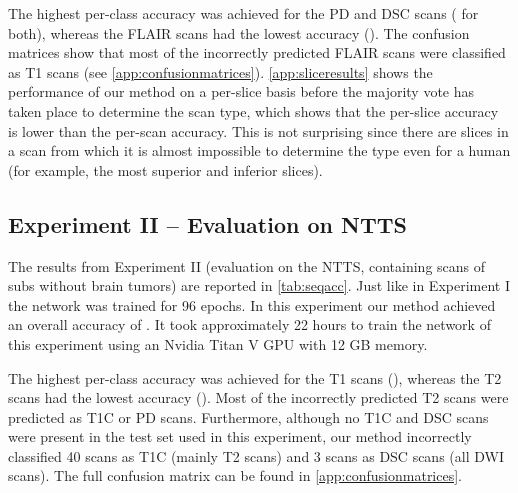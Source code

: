 The highest per-class accuracy was achieved for the \gls{PD} and \gls{DSC} \glspl{scan} ( for both), whereas the \gls{FLAIR} \glspl{scan} had the lowest accuracy ().
The confusion matrices show that most of the incorrectly predicted \gls{FLAIR} \glspl{scan} were classified as \gls{T1} \glspl{scan} (see  \cref{app:confusionmatrices}).
\cref{app:sliceresults} shows the performance of our method on a per-\gls{slice} basis before the majority vote has taken place to determine the \gls{scan} \gls{type}, which shows that the per-\gls{slice} accuracy is lower than the per-\gls{scan} accuracy.
This is not surprising since there are \glspl{slice} in a \gls{scan} from which it is almost impossible to determine the \gls{type} even for a human (for example, the most superior and inferior \glspl{slice}).


\subsection{Experiment II -- Evaluation on \gls{NTTS}}
The results from Experiment II (evaluation on the \gls{NTTS}, containing \glspl{scan} of \glspl{sub} without brain \glspl{tumor}) are reported in \cref{tab:seqacc}.
Just like in Experiment I the network was trained for 96 epochs.
In this experiment our method achieved an overall accuracy of .
It took approximately \num{22} hours to train the network of this experiment using an Nvidia Titan V GPU with 12 GB memory.

The highest per-class accuracy was achieved for the \gls{T1} \glspl{scan} (), whereas the \gls{T2} \glspl{scan} had the lowest accuracy ().
Most of the incorrectly predicted \gls{T2} \glspl{scan} were predicted as \gls{T1C} or \gls{PD} \glspl{scan}.
Furthermore, although no \gls{T1C} and \gls{DSC} \glspl{scan} were present in the test set used in this experiment, our method incorrectly classified 40 \glspl{scan} as \gls{T1C} (mainly \gls{T2} \glspl{scan}) and 3 \glspl{scan} as \gls{DSC} \glspl{scan} (all \gls{DWI} \glspl{scan}).
The full confusion matrix can be found in \cref{app:confusionmatrices}.

